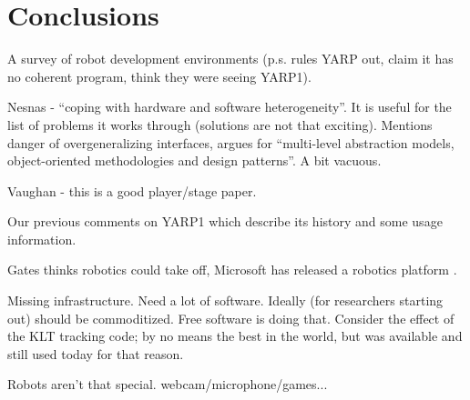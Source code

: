 
\section{Conclusions}

A survey of robot development environments
\cite{kramer2007development} (p.s. rules YARP out, claim it has
no coherent program, think they were seeing YARP1).



Nesnas \cite{nesnas2006claraty} - ``coping with hardware and software 
heterogeneity''.  It is useful for the list of problems it
works through (solutions are not that exciting).
%
Mentions danger of overgeneralizing interfaces, argues for 
``multi-level abstraction models, object-oriented methodologies
and design patterns''.  A bit vacuous.

Vaughan \cite{vaughan2006reusable} - this is a good player/stage
paper.


Our previous comments on YARP1 \cite{metta2006yarp} which
describe its history and some usage information.

Gates thinks robotics could take off, Microsoft has
released a robotics platform \cite{gates2007robot}.

Missing infrastructure.
Need a lot of software.
Ideally (for researchers starting out) should be commoditized.
Free software is doing that.
%
Consider the effect of the KLT tracking code; by no means
the best in the world, but was available and still used
today for that reason.



Robots aren't that special.  webcam/microphone/games...








